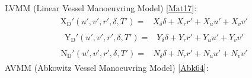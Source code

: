 \documentclass[review]{elsarticle}
\begin{document}
\sphinxAtStartPar
LVMM (Linear Vessel Manoeuvring Model) {[}\hyperlink{cite.bibligraphy:id40}{Mat17}{]}:
\begin{equation}\label{equation:02.01_VMMs:eqxlinear}
\begin{split}\begin{split}
\operatorname{X_{D}'}{\left(u',v',r',\delta,T' \right)} = & X_{\delta} \delta + X_{r} r' + X_{u} u' + X_{v} v' 
\end{split}\end{split}
\end{equation}\begin{equation}\label{equation:02.01_VMMs:eqylinear}
\begin{split}\begin{split}
\operatorname{Y_{D}'}{\left(u',v',r',\delta,T' \right)} = & Y_{\delta} \delta + Y_{r} r' + Y_{u} u' + Y_{v} v' 
\end{split}\end{split}
\end{equation}\begin{equation}\label{equation:02.01_VMMs:eqnlinear}
\begin{split}\begin{split}
\operatorname{N_{D}'}{\left(u',v',r',\delta,T' \right)} = & N_{\delta} \delta + N_{r} r' + N_{u} u' + N_{v} v' 
\end{split}\end{split}
\end{equation}
\sphinxAtStartPar
AVMM (Abkowitz Vessel Manoeuvring Model) {[}\hyperlink{cite.bibligraphy:id25}{Abk64}{]}:
\end{document}
